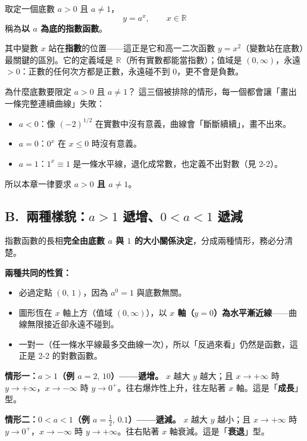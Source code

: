 \documentclass[11pt]{article}
\begin{document}
\begin{center}
取定一個底數 $a>0$ 且 $a\ne 1$，
$$\boxed{\,y=a^{x},\qquad x\in\mathbb{R}\,}$$
稱為\textbf{以 $a$ 為底的指數函數}。
\end{center}

其中變數 $x$ 站在\textbf{指數}的位置——這正是它和高一二次函數 $y=x^2$（變數站在底數）最關鍵的區別。它的定義域是 $\mathbb{R}$（所有實數都能當指數）；值域是 $(0,\infty)$，永遠 $>0$：正數的任何次方都是正數，永遠碰不到 $0$，更不會是負數。

\begin{補充框}{為什麼底數要限定 $a>0$ 且 $a\ne1$？}
這三個被排除的情形，每一個都會讓「畫出一條完整連續曲線」失敗：
\begin{itemize}\setlength{\itemsep}{1pt}
\item $a<0$：像 $(-2)^{1/2}$ 在實數中沒有意義，曲線會「斷斷續續」，畫不出來。
\item $a=0$：$0^{x}$ 在 $x\le0$ 時沒有意義。
\item $a=1$：$1^{x}\equiv 1$ 是一條水平線，退化成常數，也定義不出對數（見 2-2）。
\end{itemize}
所以本章一律要求 \textbf{$a>0$ 且 $a\ne1$}。
\end{補充框}

\subsection*{\sffamily B.\ 兩種樣貌：$a>1$ 遞增、$0<a<1$ 遞減}

指數函數的長相\textbf{完全由底數 $a$ 與 $1$ 的大小關係決定}，分成兩種情形，務必分清楚。

\textbf{兩種共同的性質：}
\begin{itemize}\setlength{\itemsep}{1pt}
\item 必過定點 $(0,\,1)$，因為 $a^0=1$ 與底數無關。
\item 圖形恆在 $x$ 軸上方（值域 $(0,\infty)$），以 \textbf{$x$ 軸（$y=0$）為水平漸近線}——曲線無限接近卻永遠不碰到。
\item 一對一（任一條水平線最多交曲線一次），所以「反過來看」仍然是函數，這正是 2-2 的對數函數。
\end{itemize}

\textbf{情形一：$a>1$（例 $a=2,\,10$）——遞增。} $x$ 越大 $y$ 越大；且 $x\to+\infty$ 時 $y\to+\infty$，$x\to-\infty$ 時 $y\to 0^{+}$。往右爆炸性上升，往左貼著 $x$ 軸。這是「\textbf{成長}」型。

\textbf{情形二：$0<a<1$（例 $a=\tfrac12,\,0.1$）——遞減。} $x$ 越大 $y$ 越小；且 $x\to+\infty$ 時 $y\to 0^{+}$，$x\to-\infty$ 時 $y\to+\infty$。往右貼著 $x$ 軸衰減。這是「\textbf{衰退}」型。
\end{document}
